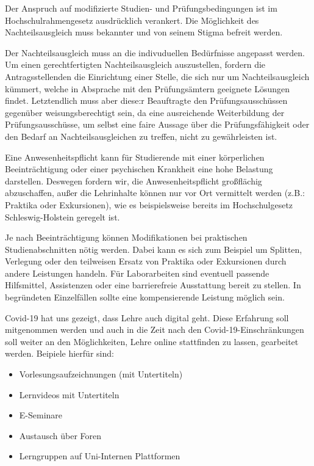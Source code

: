 \documentclass[DIV=calc]{scrartcl}
\begin{document}
Der Anspruch auf modifizierte Studien- und Prüfungsbedingungen ist im Hochschulrahmengesetz ausdrücklich verankert. Die Möglichkeit des Nachteilsausgleich muss bekannter und von seinem Stigma befreit werden. 

Der Nachteilsausgleich  muss an die indivuduellen Bedürfnisse angepasst werden. Um einen gerechtfertigten Nachteilsausgleich auszustellen, fordern die Antragsstellenden die Einrichtung einer Stelle, die sich nur um Nachteilsausgleich kümmert, welche in Absprache mit den Prüfungsämtern geeignete Lösungen findet. Letztendlich muss aber diese:r Beauftragte den Prüfungsausschüssen gegenüber weisungsberechtigt sein, da eine ausreichende Weiterbildung der Prüfungsausschüsse, um selbst eine faire Aussage über die Prüfungsfähigkeit oder den Bedarf an Nachteilsausgleichen zu treffen, nicht zu gewährleisten ist.


Eine Anwesenheitspflicht kann für Studierende mit einer körperlichen Beeinträchtigung oder einer psychischen Krankheit eine hohe Belastung darstellen.
Deswegen fordern wir, die Anwesenheitspflicht großflächig abzuschaffen, außer die Lehrinhalte können nur vor Ort vermittelt werden (z.B.: Praktika oder Exkursionen), wie es beispielsweise bereits im Hochschulgesetz Schleswig-Holstein geregelt ist.

Je nach Beeinträchtigung können Modifikationen bei praktischen Studienabschnitten nötig werden. Dabei kann es sich zum Beispiel um Splitten, Verlegung oder den teilweisen Ersatz von Praktika oder Exkursionen durch andere Leistungen handeln. Für Laborarbeiten sind eventuell passende Hilfsmittel, Assistenzen oder eine barrierefreie Ausstattung bereit zu stellen. In begründeten Einzelfällen sollte eine kompensierende Leistung möglich sein.


Covid-19 hat uns gezeigt, dass Lehre auch digital geht. Diese Erfahrung soll mitgenommen werden und auch in die Zeit nach den Covid-19-Einschränkungen soll weiter an den Möglichkeiten, Lehre online stattfinden zu lassen, gearbeitet werden.
Beipiele hierfür sind:
\begin{itemize}
    \itemsep0pt
    \item Vorlesungsaufzeichnungen (mit Untertiteln)
    \item Lernvideos mit Untertiteln
    \item E-Seminare
    \item Austausch über Foren
    \item Lerngruppen auf Uni-Internen Plattformen
\end{itemize}
\end{document}
